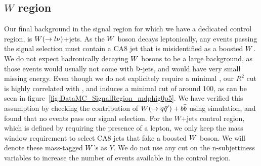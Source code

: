 

\subsection{\texorpdfstring{$W$}{W} region}

Our final background in the signal region for which we have a dedicated control region, is
$W(\rightarrow l\nu)$+jets. 
As the $W$ boson decays leptonically, any events passing the signal selection must contain a CA8
jet that is misidentified as a boosted $W$. 
We do not expect hadronically decaying $W$ bosons to be a large background, as those events would
usually not come with $\mathrm{b}$-jets, and would have very small missing energy. Even though we do not
explicitely require a minimal \ETm, our $R^2$ cut is highly correlated with \ETm, and induces
a minimal cut of around 100\GeV, as can be seen in figure~\ref{fig:DataMC_SignalRegion_mdphig0p5}.  
We have verified this assumption by checking the contribution of $W(\rightarrow
q\bar{q}')+b\bar{b}$ using simulation, and found that no events pass our signal selection. 
For the $W$+jets control region, which is defined by requiring the presence of a lepton, we only
keep the mass window requirement to select CA8 jets that fake a boosted $W$ boson. We will denote
these mass-tagged $W$'s as $Y$. We do not use any cut on the n-subjettiness variables to increase
the number of events available in the control region. 

